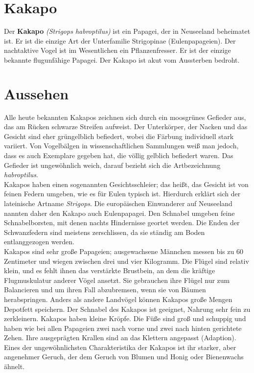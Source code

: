 \documentclass{scrartcl}
\begin{document}
\renewcommand{\headrulewidth}{1pt}
\renewcommand{\footrulewidth}{1pt}
\fancyhf[FL]{\bfseries\thepage}

\section*{Kakapo}
Der {\bfseries Kakapo} {\itshape (Strigops habroptilus)} ist ein Papagei, der in Neuseeland beheimatet ist. Er ist die einzige Art der Unterfamilie Strigopinae (Eulenpapageien). Der nachtaktive Vogel ist im Wesentlichen ein Pflanzenfresser. Er ist der einzige bekannte flugunfähige Papagei. Der Kakapo ist akut vom Aussterben bedroht.

\section*{Aussehen}

\begin{multicols}{2}
Alle heute bekannten Kakapos zeichnen sich durch ein moosgrünes Gefieder aus, das am Rücken schwarze Streifen aufweist. Der Unterkörper, der Nacken und das Gesicht sind eher grüngelblich befiedert, wobei die Färbung individuell stark variiert. Von Vogelbälgen in wissenschaftlichen Sammlungen weiß man jedoch, dass es auch Exemplare gegeben hat, die völlig gelblich befiedert waren. Das Gefieder ist ungewöhnlich weich, darauf bezieht sich die Artbezeichnung {\itshape habroptilus}.\\
Kakapos haben einen sogenannten Gesichtsschleier; das heißt, das Gesicht ist von feinen Federn umgeben, wie es für Eulen typisch ist. Hierdurch erklärt sich der lateinische Artname {\itshape Strigops}. Die europäischen Einwanderer auf Neuseeland nannten daher den Kakapo auch Eulenpapagei. Den Schnabel umgeben feine Schnabelborsten, mit denen nachts Hindernisse geortet werden. Die Enden der Schwanzfedern sind meistens zerschlissen, da sie ständig am Boden entlanggezogen werden. \\
Kakapos sind sehr große Papageien; ausgewachsene Männchen messen bis zu 60 Zentimeter und wiegen zwischen drei und vier Kilogramm. Die Flügel sind relativ klein, und es fehlt ihnen das verstärkte Brustbein, an dem die kräftige Flugmuskulatur anderer Vögel ansetzt. Sie gebrauchen ihre Flügel nur zum Balancieren und um ihren Fall abzubremsen, wenn sie von Bäumen herabspringen. Anders als andere Landvögel können Kakapos große Mengen Depotfett speichern. Der Schnabel des Kakapos ist geeignet, Nahrung sehr fein zu zerkleinern. Kakapos haben kleine Kröpfe. Die Füße sind groß und schuppig und haben wie bei allen Papageien zwei nach vorne und zwei nach hinten gerichtete Zehen. Ihre ausgeprägten Krallen sind an das Klettern angepasst (Adaption). 
Eines der ungewöhnlichsten Charakteristika der Kakapos ist ihr starker, aber angenehmer Geruch, der dem Geruch von Blumen und Honig oder Bienenwachs ähnelt.
\end{multicols}
\end{document}
